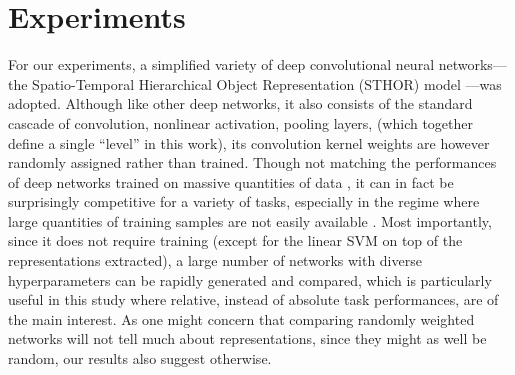 \documentclass[10pt,twocolumn,letterpaper]{article}
\begin{document}
\section{Experiments}
\label{sec:exp}

For our experiments, a simplified variety of deep convolutional neural networks---the Spatio-Temporal Hierarchical Object Representation (STHOR) model \cite{pinto2009high, sthor}---{was} adopted.
Although like other deep networks, it also consists of the standard cascade of convolution, nonlinear activation, pooling layers, \etc (which together define a single ``level'' in this work), its convolution kernel weights are however randomly assigned rather than trained.
Though not matching the performances of deep networks trained on massive quantities of data \cite{krizhevsky2012imagenet}, it can in fact be surprisingly competitive for a variety of tasks, especially in the regime where large quantities of training samples are not easily available \cite{pinto2009high, cox2011beyond, viglarge}.
Most importantly, since it does not require training (except for the linear SVM on top of the representations extracted), a large number of networks with diverse hyperparameters can be rapidly generated and compared, which is particularly useful in this study where relative, instead of absolute task performances, are of the main interest. 
As one might concern that comparing randomly weighted networks will not tell much about representations, since they might as well be random, our results also suggest otherwise.

\newcommand{\expsettings}{In other words, 32 channels of filters in top levels' convolution layers.
Following the terminology in recent literatures, shallow and deep neurons corresponded to \texttt{pool1} and \texttt{pool2} layers respectively.
Stimulus dimensionalities of the shallow and deep neurons {were} $N=121$ and $441$ (\ie spatially overlapping $11\times11$ and $21\times21$ receptive fields). %
Other minor changes included: nonlinear activations all simplified to \emph{ReLU} \cite{krizhevsky2012imagenet} mode and normalizations all conditionally subtractive mode.
Overall, the architectures were more similar to those in \cite{simonyan2014very}, except that pooling operations can be \emph{average}, \emph{squared}, or \emph{max-like} in our case.
}
\end{document}
